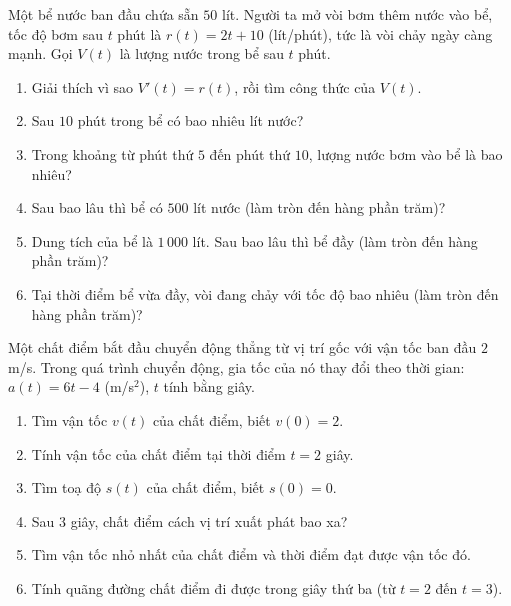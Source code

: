 \begin{bai}Một bể nước ban đầu chứa sẵn $50$ lít. Người ta mở vòi bơm thêm nước vào bể, tốc độ bơm sau $t$ phút là $r(t)=2t+10$ (lít/phút), tức là vòi chảy ngày càng mạnh. Gọi $V(t)$ là lượng nước trong bể sau $t$ phút.
\begin{enumerate}[label=\alph*)]
\item Giải thích vì sao $V'(t)=r(t)$, rồi tìm công thức của $V(t)$.
\item Sau $10$ phút trong bể có bao nhiêu lít nước?
\item Trong khoảng từ phút thứ $5$ đến phút thứ $10$, lượng nước bơm vào bể là bao nhiêu?
\item Sau bao lâu thì bể có $500$ lít nước (làm tròn đến hàng phần trăm)?
\item Dung tích của bể là $1\,000$ lít. Sau bao lâu thì bể đầy (làm tròn đến hàng phần trăm)?
\item Tại thời điểm bể vừa đầy, vòi đang chảy với tốc độ bao nhiêu (làm tròn đến hàng phần trăm)?
\end{enumerate}
\end{bai}

\begin{bai}Một chất điểm bắt đầu chuyển động thẳng từ vị trí gốc với vận tốc ban đầu $2$ m/s. Trong quá trình chuyển động, gia tốc của nó thay đổi theo thời gian: $a(t)=6t-4$ (m/s$^2$), $t$ tính bằng giây.
\begin{enumerate}[label=\alph*)]
\item Tìm vận tốc $v(t)$ của chất điểm, biết $v(0)=2$.
\item Tính vận tốc của chất điểm tại thời điểm $t=2$ giây.
\item Tìm toạ độ $s(t)$ của chất điểm, biết $s(0)=0$.
\item Sau $3$ giây, chất điểm cách vị trí xuất phát bao xa?
\item Tìm vận tốc nhỏ nhất của chất điểm và thời điểm đạt được vận tốc đó.
\item Tính quãng đường chất điểm đi được trong giây thứ ba (từ $t=2$ đến $t=3$).
\end{enumerate}
\end{bai}
